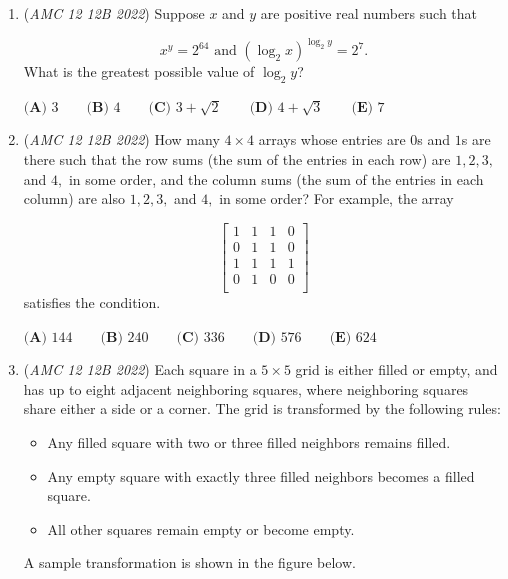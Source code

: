\begin{enumerate}
	\item (\textit{AMC 12 12B 2022}) Suppose $x$ and $y$ are positive real numbers such that

 \[x^y=2^{64}\text{ and }(\log_2{x})^{\log_2{y}}=2^{7}.\]
What is the greatest possible value of $\log_2{y}$?


 $\textbf{(A) }3 \qquad \textbf{(B) }4 \qquad \textbf{(C) }3+\sqrt{2} \qquad \textbf{(D) }4+\sqrt{3} \qquad \textbf{(E) }7$


	\item (\textit{AMC 12 12B 2022}) How many $4 \times 4$ arrays whose entries are $0$s and $1$s are there such that the row sums (the sum of the entries in each row) are $1, 2, 3,$ and $4,$ in some order, and the column sums (the sum of the entries in each column) are also $1, 2, 3,$ and $4,$ in some order? For example, the array

 \[\left[   \begin{array}{cccc}     1 & 1 & 1 & 0 \\     0 & 1 & 1 & 0 \\     1 & 1 & 1 & 1 \\     0 & 1 & 0 & 0 \\   \end{array} \right]\]
satisfies the condition.


 $\textbf{(A) }144 \qquad \textbf{(B) }240 \qquad \textbf{(C) }336 \qquad \textbf{(D) }576 \qquad \textbf{(E) }624$


	\item (\textit{AMC 12 12B 2022}) Each square in a $5 \times 5$ grid is either filled or empty, and has up to eight adjacent neighboring squares, where neighboring squares share either a side or a corner. The grid is transformed by the following rules:


 
            \begin{itemize}
        \item Any filled square with two or three filled neighbors remains filled.
            \end{itemize}
            
            \begin{itemize}
        \item Any empty square with exactly three filled neighbors becomes a filled square.
            \end{itemize}
            
            \begin{itemize}
        \item All other squares remain empty or become empty.
            \end{itemize}
            A sample transformation is shown in the figure below.


\end{enumerate}
